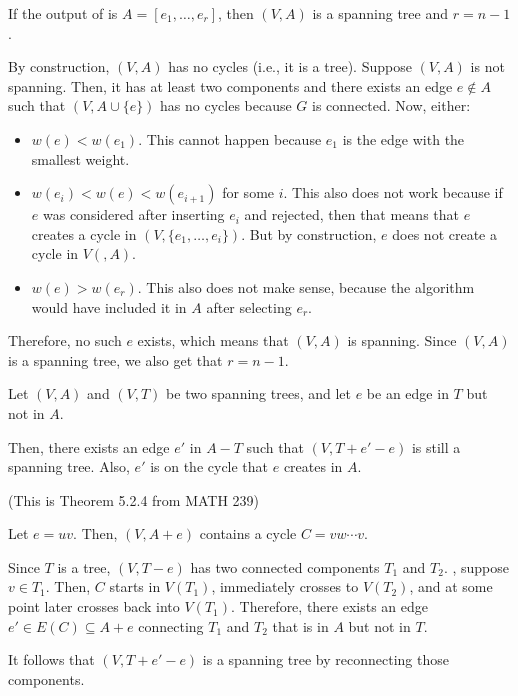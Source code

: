 \begin{claim}\label{claim:g:2}
  If the output of  is $A = [e_1,\dotsc,e_r]$,
  then $(V,A)$ is a spanning tree and $r = n-1$.
\end{claim}
\begin{prf}
  By construction, $(V,A)$ has no cycles (i.e., it is a tree).
  Suppose $(V,A)$ is not spanning.
  Then, it has at least two components and there exists an edge $e \not\in A$
  such that $(V,A\cup\{e\})$ has no cycles because $G$ is connected.
  Now, either:
  \begin{itemize}
    \item $w(e) < w(e_1)$. This cannot happen because $e_1$ is the edge with the smallest weight.
    \item $w(e_i) < w(e) < w(e_{i+1})$ for some $i$.
          This also does not work because if $e$ was considered after inserting $e_i$
          and rejected, then that means that $e$ creates a cycle in $(V,\{e_1,\dotsc,e_i\})$.
          But by construction, $e$ does not create a cycle in $V(,A)$.
    \item $w(e) > w(e_r)$. This also does not make sense, because the algorithm
          would have included it in $A$ after selecting $e_r$.
  \end{itemize}
  Therefore, no such $e$ exists, which means that $(V,A)$ is spanning.
  Since $(V,A)$ is a spanning tree, we also get that $r = n-1$.
\end{prf}

\begin{claim}\label{claim:g:3}
  Let $(V, A)$ and $(V, T)$ be two spanning trees,
  and let $e$ be an edge in $T$ but not in $A$.

  Then, there exists an edge $e'$ in $A - T$ such that
  $(V, T + e' - e)$ is still a spanning tree.
  Also, $e'$ is on the cycle that $e$ creates in $A$.

  (This is Theorem 5.2.4 from MATH 239)
\end{claim}
\begin{prf}
  Let $e = uv$. Then, $(V,A+e)$ contains a cycle $C = vw\cdots v$.

  Since $T$ is a tree, $(V,T-e)$ has two connected components $T_1$ and $T_2$.
  \WLOG, suppose $v \in T_1$.
  Then, $C$ starts in $V(T_1)$, immediately crosses to $V(T_2)$,
  and at some point later crosses back into $V(T_1)$.
  Therefore, there exists an edge $e' \in E(C) \subseteq A+e$ connecting $T_1$ and $T_2$
  that is in $A$ but not in $T$.

  It follows that $(V,T+e'-e)$ is a spanning tree by reconnecting those components.
\end{prf}


